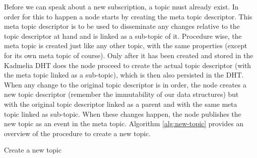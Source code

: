 Before we can speak about a new subscription, a topic must already exist. In
order for this to happen a node starts by creating the meta topic descriptor.
This meta topic descriptor is to be used to disseminate any changes relative to
the topic descriptor at hand and is linked as a sub-topic of it. Procedure
wise, the meta topic is created just like any other topic, with the same
properties (except for its own meta topic of course). Only after it has been
created and stored in the Kadmelia DHT does the node proceed to
create the actual topic descriptor (with the meta topic linked as a sub-topic),
which is then also persisted in the DHT. When any change to the
original topic descriptor is in order, the node creates a new topic descriptor
(remember the immutability of our data structures) but with the original topic
descriptor linked as a parent and with the same meta topic linked as sub-topic.
When these changes happen,  the node publishes the new topic as an event in the
meta topic.  Algorithm \ref{alg:new-topic} provides an overview of the
procedure to create a new topic.


\vspace{8pt}
\begin{algorithm}
  \SetAlgoLined
  \caption{Create a new topic}
	\label{alg:new-topic}
\end{algorithm}
\vspace{8pt}

